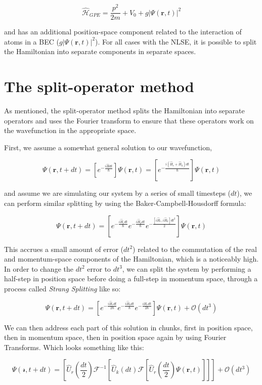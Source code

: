 $$
\mathcal{\hat H}_{GPE} = \frac{p^2}{2m} + V_0 + g|\Psi(\mathbf{r},t)|^2
$$

and has an additional position-space component related to the interaction of atoms in a BEC ($g|\Psi(\mathbf{r},t)|^2$).
For all cases with the NLSE, it is possible to split the Hamiltonian into separate components in separate spaces.

\section{The split-operator method}

As mentioned, the split-operator method splits the Hamiltonian into separate operators and uses the Fourier transform to ensure that these operators work on the wavefunction in the appropriate space.

First, we assume a somewhat general solution to our wavefunction,

$$
\Psi(\mathbf{r},t + dt) = \left[e^{-\frac{i\hat{H}dt}{\hbar}}\right]\Psi(\mathbf{r},t) = \left[e^{-\frac{i(\hat{H}_r + \hat{H}_k)dt}{\hbar}}\right]\Psi(\mathbf{r},t)
$$

and assume we are simulating our system by a series of small timesteps ($dt$), we can perform similar splitting by using the Baker-Campbell-Housdorff formula:

$$
\Psi(\mathbf{r},t+dt) = \left[e^{-\frac{i\hat{H}_rdt}{\hbar}}e^{-\frac{i\hat{H}_kdt}{\hbar}}e^{-\frac{[i\hat{H}_r, i\hat{H}_k]dt^2}{2}}\right]\Psi(\mathbf{r},t)
$$

This accrues a small amount of error ($dt^2$) related to the commutation of the real and momentum-space components of the Hamiltonian, which is a noticeably high.
In order to change the $dt^2$ error to $dt^3$, we can split the system by performing a half-step in position space before doing a full-step in momentum space, through a process called \textit{Strang Splitting} like so:

$$
\Psi(\mathbf{r},t+dt) = \left[e^{-\frac{i\hat{H}_rdt}{2\hbar}}e^{-\frac{i\hat{H}_kdt}{\hbar}}e^{-\frac{i\hat{H}_rdt}{2\hbar}} \right]\Psi(\mathbf{r},t) + \mathcal{O}(dt^3)
$$

We can then address each part of this solution in chunks, first in position space, then in momentum space, then in position space again by using Fourier Transforms.
Which looks something like this:

$$
\Psi(\mathcal{r}, t+dt) = \left[\hat{U}_r\left(\frac{dt}{2}\right)\mathcal{F}^{-1}\left[\hat{U}_k(dt) \mathcal{F} \left[\hat{U}_r\left(\frac{dt}{2}\right) \Psi(\mathbf{r},t) \right] \right] \right] + \mathcal{O}(dt^3)
$$

